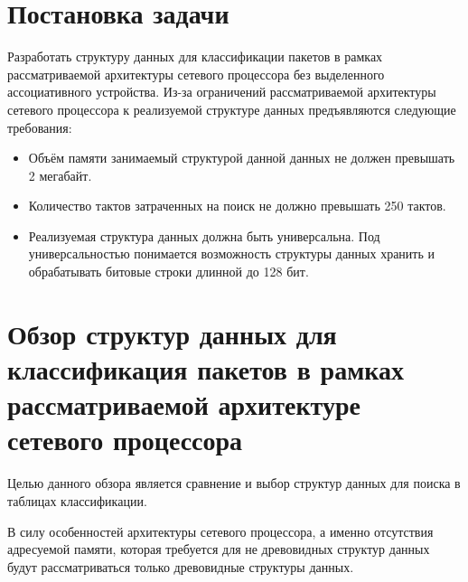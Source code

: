 \documentclass[a4paper, 12pt, titlepage, finall]{extreport}
\begin{document}
    \chapter{Постановка задачи} 
        Разработать структуру данных для классификации пакетов в рамках рассматриваемой архитектуры сетевого процессора без выделенного ассоциативного устройства. 
        Из-за ограничений рассматриваемой архитектуры сетевого процессора к реализуемой структуре данных предъявляются следующие требования:

        \begin{itemize}
            \item Объём памяти занимаемый структурой данной данных не должен превышать 2 мегабайт.
            \item Количество тактов затраченных на поиск не должно превышать 250 тактов.
            \item Реализуемая структура данных должна быть универсальна. Под универсальностью понимается возможность структуры данных хранить и обрабатывать битовые строки длинной до 128 бит.
        \end{itemize}
    \chapter{Обзор структур данных для классификация пакетов в рамках рассматриваемой архитектуре сетевого процессора}
        Целью данного обзора является сравнение и выбор структур данных для поиска в таблицах классификации. 

        В силу особенностей архитектуры сетевого процессора, а именно отсутствия адресуемой памяти, 
        которая требуется для не древовидных структур данных будут рассматриваться только древовидные структуры данных. 
        
\end{document}
